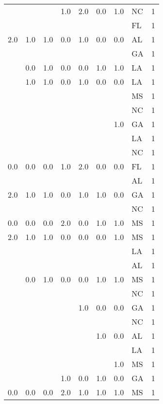 \begin{tabular}{llllllllr}
    &     &     & 1.0 & 2.0 & 0.0 & 1.0 & NC &     1 \\
    &     &     &     &     &     &     & FL &     1 \\
2.0 & 1.0 & 1.0 & 0.0 & 1.0 & 0.0 & 0.0 & AL &     1 \\
    &     &     &     &     &     &     & GA &     1 \\
    & 0.0 & 1.0 & 0.0 & 0.0 & 1.0 & 1.0 & LA &     1 \\
    & 1.0 & 1.0 & 0.0 & 1.0 & 0.0 & 0.0 & LA &     1 \\
    &     &     &     &     &     &     & MS &     1 \\
    &     &     &     &     &     &     & NC &     1 \\
    &     &     &     &     &     & 1.0 & GA &     1 \\
    &     &     &     &     &     &     & LA &     1 \\
    &     &     &     &     &     &     & NC &     1 \\
0.0 & 0.0 & 0.0 & 1.0 & 2.0 & 0.0 & 0.0 & FL &     1 \\
    &     &     &     &     &     &     & AL &     1 \\
2.0 & 1.0 & 1.0 & 0.0 & 1.0 & 1.0 & 0.0 & GA &     1 \\
    &     &     &     &     &     &     & NC &     1 \\
0.0 & 0.0 & 0.0 & 2.0 & 0.0 & 1.0 & 1.0 & MS &     1 \\
2.0 & 1.0 & 1.0 & 0.0 & 0.0 & 0.0 & 1.0 & MS &     1 \\
    &     &     &     &     &     &     & LA &     1 \\
    &     &     &     &     &     &     & AL &     1 \\
    & 0.0 & 1.0 & 0.0 & 0.0 & 1.0 & 1.0 & MS &     1 \\
    &     &     &     &     &     &     & NC &     1 \\
    &     &     &     & 1.0 & 0.0 & 0.0 & GA &     1 \\
    &     &     &     &     &     &     & NC &     1 \\
    &     &     &     &     & 1.0 & 0.0 & AL &     1 \\
    &     &     &     &     &     &     & LA &     1 \\
    &     &     &     &     &     & 1.0 & MS &     1 \\
    &     &     & 1.0 & 0.0 & 1.0 & 0.0 & GA &     1 \\
0.0 & 0.0 & 0.0 & 2.0 & 1.0 & 1.0 & 1.0 & MS &     1 \\

\end{tabular}
